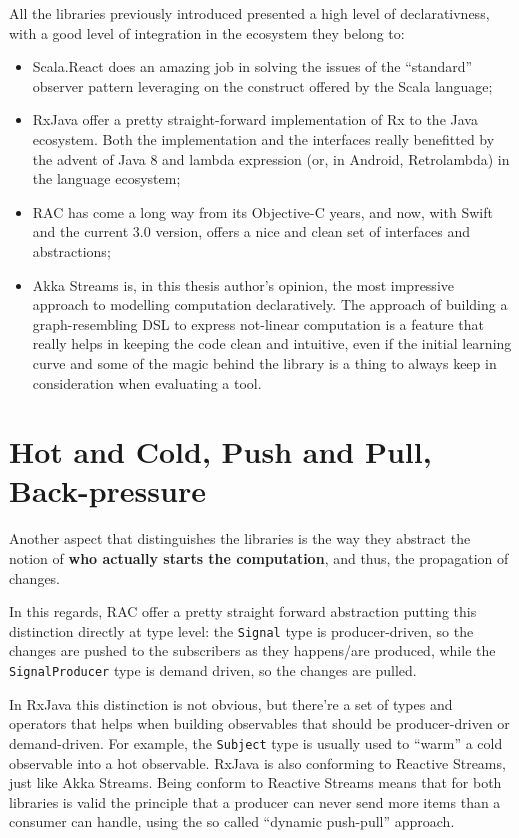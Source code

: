 All the libraries previously introduced presented a high level of
declarativness, with a good level of integration in the ecosystem they
belong to:

\begin{itemize}
\itemsep1pt\parskip0pt
\item
  Scala.React does an amazing job in solving the issues of the
  ``standard'' observer pattern leveraging on the construct offered by
  the Scala language;
\item
  RxJava offer a pretty straight-forward implementation of Rx to the Java
  ecosystem. Both the implementation and the interfaces really
  benefitted by the advent of Java 8 and lambda expression (or, in
  Android, Retrolambda) in the language ecosystem;
\item
  RAC has come a long way from its Objective-C years, and now, with
  Swift and the current 3.0 version, offers a nice and clean set of
  interfaces and abstractions;
\item
  Akka Streams is, in this thesis author's opinion, the most impressive
  approach to modelling computation declaratively. The approach of
  building a graph-resembling DSL to express not-linear computation is a
  feature that really helps in keeping the code clean and intuitive,
  even if the initial learning curve and some of the magic behind the
  library is a thing to always keep in consideration when evaluating a
  tool.
\end{itemize}

\section{Hot and Cold, Push and Pull,
Back-pressure}\label{hot-and-cold-push-and-pull-back-pressure}

Another aspect that distinguishes the libraries is the way they abstract
the notion of \textbf{who actually starts the computation}, and thus,
the propagation of changes.

In this regards, RAC offer a pretty straight forward abstraction putting
this distinction directly at type level: the \texttt{Signal} type is
producer-driven, so the changes are pushed to the subscribers as they
happens/are produced, while the \texttt{SignalProducer} type is demand
driven, so the changes are pulled.

In RxJava this distinction is not obvious, but there're a set of types
and operators that helps when building observables that should be
producer-driven or demand-driven. For example, the \texttt{Subject} type
is usually used to ``warm'' a cold observable into a hot observable.
RxJava is also conforming to Reactive Streams, just like Akka Streams.
Being conform to Reactive Streams means that for both libraries is valid
the principle that a producer can never send more items than a consumer
can handle, using the so called ``dynamic push-pull'' approach.

